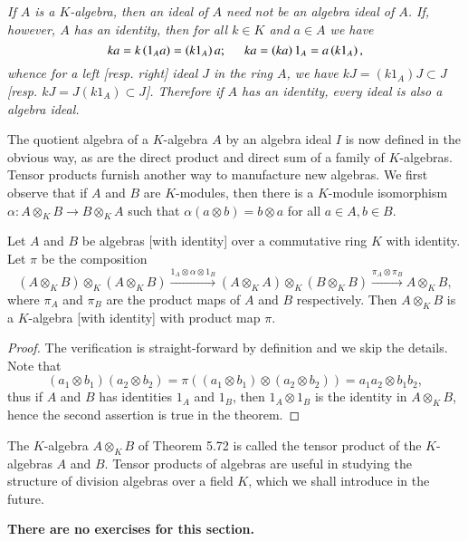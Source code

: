 \begin{note}\em
If $A$ is a $K$-algebra, then an ideal of $A$ need not be an algebra ideal of $A$. If, however, $A$ has an identity, then for all $k\in K$ and $a\in A$ we have 
$$
ka=k\left( 1_Aa \right) =\left( k1_A \right) a;\hspace{0.5cm}ka=\left( ka \right) 1_A=a\left( k1_A \right) ,
$$
whence for a left [resp. right] ideal $J$ in the ring $A$, we have $kJ=\left( k1_A \right) J\subset J$ [resp. $kJ=J(k1_A)\subset J$]. Therefore if $A$ has an identity, every ideal is also a algebra ideal.
\end{note}
The quotient algebra of a $K$-algebra $A$ by an algebra ideal $I$ is now defined in the obvious way, as are the direct product and direct sum of a family of $K$-algebras. Tensor products furnish another way to manufacture new algebras. We first observe that if $A$ and $B$ are $K$-modules, then there is a $K$-module isomorphism $\alpha:A\otimes_KB\to B\otimes_KA$ such that $\alpha(a\otimes b)=b\otimes a$ for all $a\in A,b\in B$.
\begin{theorem}
Let $A$ and $B$ be algebras [with identity] over a commutative ring $K$ with identity. Let $\pi$ be the composition 
$$
\left( A\otimes _KB \right) \otimes _K\left( A\otimes _KB \right) \overset{1_A\otimes \alpha \otimes 1_B}{\longrightarrow}\left( A\otimes _KA \right) \otimes _K\left( B\otimes _KB \right) \overset{\pi _A\otimes \pi _B}{\longrightarrow}A\otimes _KB,
$$
where $\pi_A$ and $\pi_B$ are the product maps of $A$ and $B$ respectively. Then $A\otimes_KB$ is a $K$-algebra [with identity] with product map $\pi$.
\end{theorem}
\begin{proof}
The verification is straight-forward by definition and we skip the details. Note that 
$$
\left( a_1\otimes b_1 \right) \left( a_2\otimes b_2 \right) =\pi \left( \left( a_1\otimes b_1 \right) \otimes \left( a_2\otimes b_2 \right) \right) =a_1a_2\otimes b_1b_2,
$$
thus if $A$ and $B$ has identities $1_A$ and $1_B$, then $1_A\otimes 1_B$ is the identity in $A\otimes_KB$, hence the second assertion is true in the theorem.
\end{proof}
The $K$-algebra $A\otimes_KB$ of Theorem 5.72 is called the tensor product of the $K$-algebras $A$ and $B$. Tensor products of algebras are useful in studying the structure of division algebras over a field $K$, which we shall introduce in the future.\par
\textbf{There are no exercises for this section.}